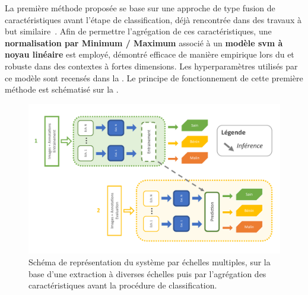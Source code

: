 La première méthode proposée se base sur une approche de type fusion de caractéristiques avant l'étape de classification, déjà rencontrée dans des travaux à but similaire~\cite{Pedersoli2011,Alsaih2016}. Afin de permettre l'agrégation de ces caractéristiques, une \textbf{normalisation par Minimum / Maximum} associé à un \textbf{modèle \gls{svm} à noyau linéaire} est employé, démontré efficace de manière empirique lors du  et robuste dans des contextes à fortes dimensions. Les hyperparamètres utilisés par ce modèle sont recensés dans la . Le principe de fonctionnement de cette première méthode est schématisé sur la .\par

\begin{figure}[H]
    \centering
    \includegraphics[width=0.8 \linewidth]{contents/chapter_6/resources/scheme_image_improvement_multiscale_features.pdf}
    \caption{Schéma de représentation du système par échelles multiples, sur la base d'une extraction à diverses échelles puis par l'agrégation des caractéristiques avant la procédure de classification.}
    \label{fig:scheme_image_improvement_multiscale_features}
\end{figure}\par


